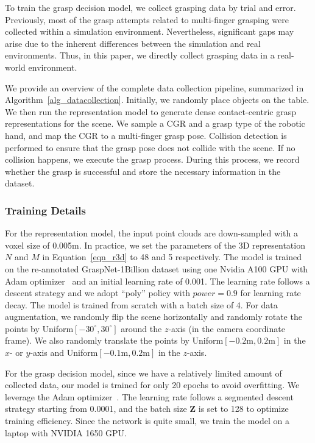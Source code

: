 To train the grasp decision model, we collect grasping data by trial and error. Previously, most of the grasp attempts related to multi-finger grasping were collected within a simulation environment. Nevertheless, significant gaps may arise due to the inherent differences between the simulation and real environments. Thus, in this paper, we directly collect grasping data in a real-world environment.

We provide an overview of the complete data collection pipeline, summarized in Algorithm~\ref{alg_datacollection}. Initially, we randomly place objects on the table. We then run the representation model to generate dense contact-centric grasp representations for the scene. We sample a CGR and a grasp type of the robotic hand, and map the CGR to a multi-finger grasp pose. Collision detection is performed to ensure that the grasp pose does not collide with the scene. If no collision happens, we execute the grasp process. During this process, we record whether the grasp is successful and store the necessary information in the dataset. 


\subsubsection*{Training Details}
For the representation model, the input point clouds are down-sampled with a voxel size of 0.005m. In practice, we set the parameters of the 3D representation $N$ and $M$ in Equation~\eqref{eqn_r3d} to 48 and 5 respectively. The model is trained on the re-annotated GraspNet-1Billion dataset using one Nvidia A100 GPU with Adam optimizer~\cite{kingma2014adam} and an initial learning rate of 0.001. The learning rate follows a descent strategy and we adopt ``poly'' policy with $power=0.9$ for learning rate decay. The model is trained from scratch with a batch size of 4. For data augmentation, we randomly flip the scene horizontally and randomly rotate the points by Uniform$[-30^\circ,30^\circ]$ around the $z$-axis (in the camera coordinate frame). We also randomly translate the points by Uniform$[-0.2\text{m},0.2\text{m}]$ in the $x$- or $y$-axis and Uniform$[-0.1\text{m},0.2\text{m}]$ in the $z$-axis.

For the grasp decision model, since we have a relatively limited amount of collected data, our model is trained for only 20 epochs to avoid overfitting. We leverage the Adam optimizer~\cite{kingma2014adam}. The learning rate follows a segmented descent strategy starting from 0.0001, and the batch size $\mathbf{Z}$ is set to 128 to optimize training efficiency. Since the network is quite small, we train the model on a laptop with NVIDIA 1650 GPU.


